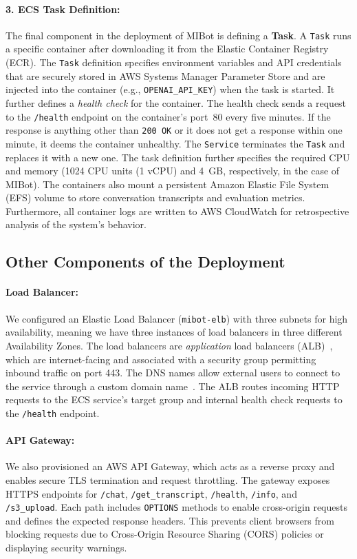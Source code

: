 \paragraph{3. ECS Task Definition:}The final component in the deployment of MIBot is defining a \textbf{Task}. A \texttt{Task} runs a specific container after downloading it from the Elastic Container Registry (ECR). The \texttt{Task} definition specifies environment variables and API credentials that are securely stored in AWS Systems Manager Parameter Store and are injected into the container (e.g., \texttt{OPENAI\_API\_KEY}) when the task is started. It further defines a \emph{health check} for the container. The health check sends a request to the \texttt{/health} endpoint on the container's port~80 every five minutes. If the response is anything other than \texttt{200 OK} or it does not get a response within one minute, it deems the container unhealthy. The \texttt{Service} terminates the \texttt{Task} and replaces it with a new one. The task definition further specifies the required CPU and memory (1024 CPU units (1 vCPU) and 4~GB, respectively, in the case of MIBot). The containers also mount a persistent Amazon Elastic File System (EFS) volume to store conversation transcripts and evaluation metrics. Furthermore, all container logs are written to AWS CloudWatch for retrospective analysis of the system's behavior.

\subsection{Other Components of the Deployment}

\paragraph{Load Balancer:}We configured an Elastic Load Balancer (\texttt{mibot-elb}) with three subnets for high availability, meaning we have three instances of load balancers in three different Availability Zones. The load balancers are \emph{application} load balancers (ALB)~\citep{aws_alb}, which are internet-facing and associated with a security group permitting inbound traffic on port 443. The DNS names allow external users to connect to the service through a custom domain name~\citep{shopify_domain_seo}. The ALB routes incoming HTTP requests to the ECS service's target group and internal health check requests to the \texttt{/health} endpoint.

\paragraph{API Gateway:}We also provisioned an AWS API Gateway, which acts as a reverse proxy and enables secure TLS termination and request throttling. The gateway exposes HTTPS endpoints for \texttt{/chat}, \texttt{/get\_transcript}, \texttt{/health}, \texttt{/info}, and \texttt{/s3\_upload}. Each path includes \texttt{OPTIONS} methods to enable cross-origin requests and defines the expected response headers. This prevents client browsers from blocking requests due to Cross-Origin Resource Sharing (CORS) policies or displaying security warnings.

